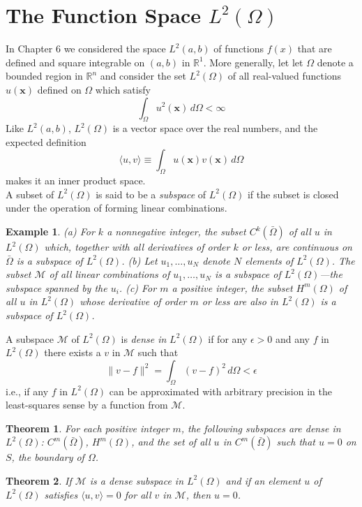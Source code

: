 \documentclass[11pt]{book}
\theoremstyle{example}
\newtheorem{example}{Example}[chapter]
\theoremstyle{problem}
\theoremstyle{theorem}
\newtheorem{theorem}{Theorem}[chapter]
\theoremstyle{definition}
\begin{document}
\section{The Function Space $L^2(\Omega)$}
In Chapter 6 we considered the space $L^2(a,b)$ of functions $f(x)$ that are defined and square integrable on $(a,b)$ in $\mathbb{R}^1$. More generally, let let $\Omega$ denote a bounded region in $\mathbb{R}^n$ and consider the set $L^2(\Omega)$ of all real-valued functions $u(\mathbf{x})$ defined on $\Omega$ which satisfy
\begin{equation}
	\int_\Omega{u^2(\mathbf{x})\,d\Omega}<\infty
\end{equation}
Like $L^2(a,b)$, $L^2(\Omega)$ is a vector space over the real numbers, and the expected definition
\begin{equation}
	\langle{u,v}\rangle\equiv\int_\Omega{u(\mathbf{x})v(\mathbf{x})\,d\Omega}
\end{equation}
makes it an inner product space.\\
A subset of $L^2(\Omega)$ is said to be a \emph{subspace} of $L^2(\Omega)$ if the subset is closed under the operation of forming linear combinations.
\begin{example}
	(a) For $k$ a nonnegative integer, the subset $C^k(\bar{\Omega})$ of all $u$ in $L^2(\Omega)$ which, together with all derivatives of order $k$ or less, are continuous on $\bar{\Omega}$ is a subspace of $L^2(\Omega)$. (b) Let $u_1,\dots,u_N$ denote $N$ elements of $L^2(\Omega)$. The subset $\mathscr{M}$ of all linear combinations of $u_1,\dots,u_N$ is a subspace of $L^2(\Omega)$---the subspace \emph{spanned} by the $u_i$. (c) For $m$ a positive integer, the subset $H^m(\Omega)$ of all $u$ in $L^2(\Omega)$ whose derivative of order $m$ or less are also in $L^2(\Omega)$ is a subspace of $L^2(\Omega)$.
\end{example}
A subspace $\mathscr{M}$ of $L^2(\Omega)$ is \emph{dense in} $L^2(\Omega)$ if for any $\epsilon>0$ and any $f$ in $L^2(\Omega)$ there exists a $v$ in $\mathscr{M}$ such that
\begin{equation}
	\|v-f\|^2=\int_\Omega{(v-f)^2\,d\Omega}<\epsilon
\end{equation}
i.e., if any $f$ in $L^2(\Omega)$ can be approximated with arbitrary precision in the least-squares sense by a function from $\mathscr{M}$.
\begin{theorem}
	For each positive integer $m$, the following subspaces are dense in $L^2(\Omega)$: $C^m(\bar{\Omega})$, $H^m(\Omega)$, and the set of all $u$ in $C^m(\bar{\Omega})$ such that $u=0$ on $S$, the boundary of $\Omega$.
\end{theorem}
\begin{theorem}\label{thm:dense}
	If $\mathscr{M}$ is a dense subspace in $L^2(\Omega)$ and if an element $u$ of $L^2(\Omega)$ satisfies $\langle{u,v}\rangle=0$ for all $v$ in $\mathscr{M}$, then $u=0$.
\end{theorem}
\end{document}
